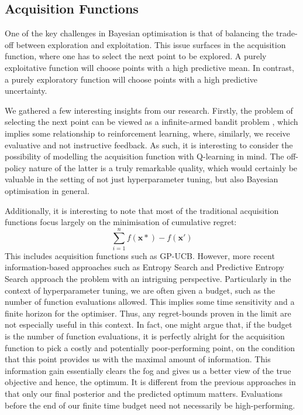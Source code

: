 \documentclass[letterpaper]{article}
\begin{document}
\subsection{Acquisition Functions}
One of the key challenges in Bayesian optimisation is that of balancing the trade-off
between exploration and exploitation. This issue surfaces in the acquisition function,
where one has to select the next point to be explored. A purely exploitative function
will choose points with a high predictive mean. In contrast, a purely exploratory
function will choose points with a high predictive uncertainty.

We gathered a few interesting insights from our research. 
Firstly, the problem of selecting the next point can be viewed as a infinite-armed
bandit problem \cite{hoffman2011portfolio}, which implies some relationship to
reinforcement learning, where, similarly, we receive evaluative and not instructive
feedback. As such, it is interesting to consider the possibility of modelling the
acquisition function with Q-learning in mind. The off-policy nature of the latter is
a truly remarkable quality, which would certainly be valuable in the setting of not
just hyperparameter tuning, but also Bayesian optimisation in general.

Additionally, it is interesting to note that most of the traditional acquisition
functions focus largely on the minimisation of cumulative regret:
$$\sum_{i=1}^{n} f(\textbf{x}*) - f(\textbf{x}')$$
This includes acquisition functions such as GP-UCB. However, more recent 
information-based approaches such as Entropy Search \cite{hennig2012entropy} and 
Predictive Entropy Search approach the problem with an intriguing perspective.
Particularly in the context of hyperparameter tuning, we are often given a budget,
such as the number of function evaluations allowed. This implies some time sensitivity
and a finite horizon for the optimiser. Thus, any regret-bounds proven in the limit
are not especially useful in this context. In fact, one might argue that, if the
budget is the number of function evaluations, it is perfectly alright for the
acquisition function to pick a costly and potentially poor-performing point,
on the condition that this point provides us with the maximal amount of information.
This information gain essentially clears the fog and gives us a better view of the
true objective and hence, the optimum. It is different from the previous approaches
in that only our final posterior and the predicted optimum matters. Evaluations
before the end of our finite time budget need not necessarily be high-performing.
\end{document}
